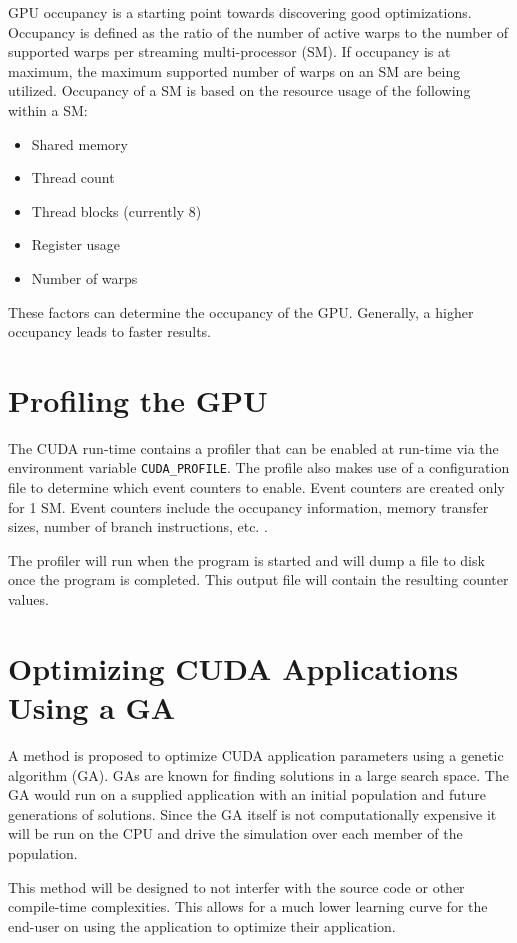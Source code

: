 \documentclass[twocolumn]{IEEEtran}
\begin{document}
GPU occupancy is a starting point towards discovering good optimizations. Occupancy is defined as the ratio of the number of active warps to the number of supported warps per streaming multi-processor (SM). If occupancy is at maximum, the maximum supported number of warps on an SM are being utilized. Occupancy of a SM is based on the resource usage of the following within a SM:

\begin{itemize}
\item{Shared memory}
\item{Thread count}
\item{Thread blocks (currently 8)}
\item{Register usage}
\item{Number of warps}
\end{itemize}

These factors can determine the occupancy of the GPU. Generally, a higher occupancy leads to faster results.

\section{Profiling the GPU}
The CUDA run-time contains a profiler that can be enabled at run-time via the environment variable \texttt{CUDA\_PROFILE}. The profile also makes use of a configuration file to determine which event counters to enable. Event counters are created only for 1 SM. Event counters include the occupancy information, memory transfer sizes, number of branch instructions, etc. \cite{CUDAProf}.

The profiler will run when the program is started and will dump a file to disk once the program is completed. This output file will contain the resulting counter values.

\section{Optimizing CUDA Applications Using a GA}
A method is proposed to optimize CUDA application parameters using a genetic algorithm (GA). GAs are known for finding solutions in a large search space. The GA would run on a supplied application with an initial population and future generations of solutions. Since the GA itself is not computationally expensive it will be run on the CPU and drive the simulation over each member of the population.

This method will be designed to not interfer with the source code or other compile-time complexities.
This allows for a much lower learning curve for the end-user on using the application to optimize their application.
\end{document}
